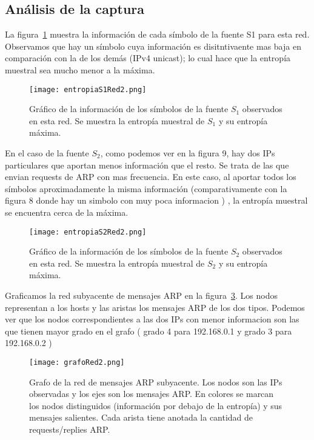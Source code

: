 \subsection{Análisis de la captura}

La figura~\ref{entropias1_2} muestra la información de cada símbolo de la fuente S1 para esta red. 
Observamos que hay un símbolo cuya información es disitntivaente mas baja en comparación con la de los demás (IPv4 unicast); lo cual  hace que la entropía muestral sea mucho menor a la máxima.

\begin{figure}[H]
\centering
\texttt{[image: entropiaS1Red2.png]}
\caption{Gráfico de la información de los símbolos de la fuente $S_1$ observados en esta red. Se muestra la entropía muestral de $S_1$ y su entropía máxima.}
\label{entropias1_2}
\end{figure}

En el caso de la fuente $S_2$, como podemos ver en la figura 9, hay dos IPs particulares que aportan menos información que el resto. 
Se trata de las que envian requests de ARP con mas frecuencia. En este caso, al aportar todos los símbolos aproximadamente la misma información (comparativamente con la figura 8 donde hay un simbolo con muy poca informacion ) , la entropía muestral se encuentra cerca de la máxima.

\begin{figure}[H]
\centering
\texttt{[image: entropiaS2Red2.png]}
\caption{Gráfico de la información de los símbolos de la fuente $S_2$ observados en esta red. Se muestra la entropía muestral de $S_2$ y su entropía máxima.}
\label{entropias2_2}
\end{figure}

Graficamos la red subyacente de mensajes ARP en la figura~\ref{grafo2}. Los nodos representan a los hosts y las aristas los mensajes ARP de los dos tipos. 
Podemos ver que los nodos correspondientes a las dos IPs con menor informacion son las que tienen mayor grado en el grafo ( grado 4 para 192.168.0.1 y grado 3 para 192.168.0.2 )

\begin{figure}[H]
\centering
\texttt{[image: grafoRed2.png]}
\caption{Grafo de la red de mensajes ARP subyacente. Los nodos son las IPs observadas y los ejes son los mensajes ARP. En colores se marcan los nodos distinguidos (información por debajo de la entropía) y sus mensajes salientes. Cada arista tiene anotada la cantidad de requests/replies ARP.}
\label{grafo2}
\end{figure}